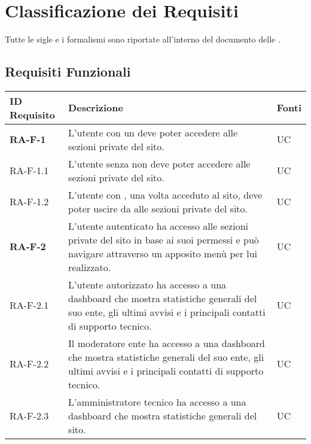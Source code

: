 \section{Classificazione dei Requisiti}

Tutte le sigle e i formalismi sono riportate all'interno del documento delle .

	\subsection{Requisiti Funzionali}


	\begin{center}
		\begin{longtable}{|p{3cm}|p{10cm}|p{2cm}|}
		\hline
		\rowcolor{lighter-grayer}
		\textbf{ID Requisito} & \textbf{Descrizione} & \textbf{Fonti} \\
		\hline
		\endfirsthead

		\rowcolor{redroundrobin}
		\textbf{RA-F-1} & L'utente con un \glock{account valido} deve poter accedere alle sezioni private del sito. & UC \\ \hline
		{\color{gray} RA-F-}1.1 & L'utente senza \glock{account valido} non deve poter accedere alle sezioni private del sito. & UC \\ \hline
		{\color{gray} RA-F-}1.2 & L'utente con \glock{account valido}, una volta acceduto al sito, deve poter uscire da alle sezioni private del sito. & UC \\ \hline
		
		\rowcolor{redroundrobin}
		\textbf{RA-F-2} & L'utente autenticato ha accesso alle sezioni private del sito in base ai suoi permessi e può navigare attraverso un apposito menù per lui realizzato. & UC \\ \hline 
		
		{\color{gray} RA-F-}2.1 & L'utente autorizzato ha accesso a una dashboard che mostra statistiche generali del suo ente, gli ultimi avvisi e i principali contatti di supporto tecnico. & UC \\ \hline
		{\color{gray} RA-F-}2.2 & Il moderatore ente ha accesso a una dashboard che mostra statistiche generali del suo ente, gli ultimi avvisi e i principali contatti di supporto tecnico. & UC \\ \hline
		{\color{gray} RA-F-}2.3 & L'amministratore tecnico ha accesso a una dashboard che mostra statistiche generali del sito. & UC \\ \hline
		

\end{longtable}
\end{center}
